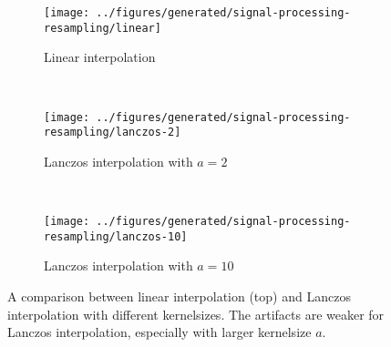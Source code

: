 


%
\begin{figure}
    \begin{subfigure}{\textwidth}
        \texttt{[image: ../figures/generated/signal-processing-resampling/linear]}
        \caption{Linear interpolation}
    \end{subfigure}
    ~
    \begin{subfigure}{\textwidth}
        \texttt{[image: ../figures/generated/signal-processing-resampling/lanczos-2]}
        \caption{Lanczos interpolation with $a=2$}
    \end{subfigure}
    ~
    \begin{subfigure}{\textwidth}
        \texttt{[image: ../figures/generated/signal-processing-resampling/lanczos-10]}
        \caption{Lanczos interpolation with $a=10$}
    \end{subfigure}
    \caption{A comparison between linear interpolation (top) and Lanczos interpolation with different kernelsizes. The artifacts are weaker for Lanczos interpolation, especially with larger kernelsize $a$.}
    \label{fig:theory:signal-processing:resampling}
\end{figure}





